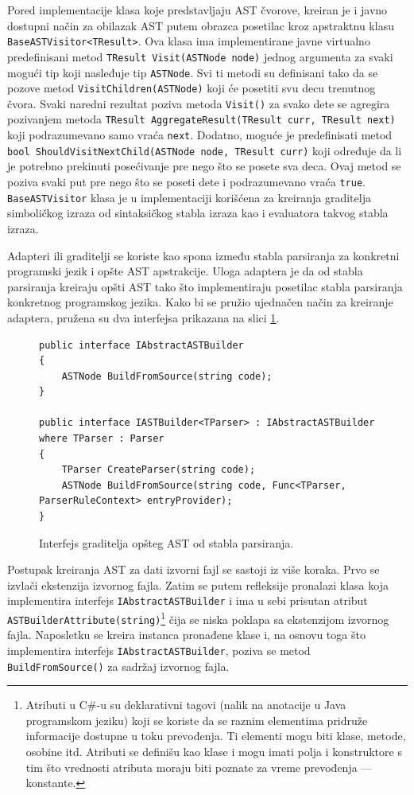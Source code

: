 Pored implementacije klasa koje predstavljaju AST čvorove, kreiran je i javno dostupni način za obilazak AST putem obrazca posetilac kroz apstraktnu klasu \texttt{BaseASTVisitor<TResult>}. Ova klasa ima implementirane javne virtualno predefinisani metod \texttt{TResult Visit(ASTNode node)} jednog argumenta za svaki mogući tip koji nasleđuje tip \texttt{ASTNode}. Svi ti metodi su definisani tako da se pozove metod \texttt{VisitChildren(ASTNode)} koji će posetiti svu decu trenutnog čvora. Svaki naredni rezultat poziva metoda \texttt{Visit()} za svako dete se agregira pozivanjem metoda \texttt{TResult AggregateResult(TResult curr, TResult next)} koji podrazumevano samo vraća \texttt{next}. Dodatno, moguće je predefinisati metod \texttt{bool ShouldVisitNextChild(ASTNode node, TResult curr)} koji određuje da li je potrebno prekinuti posećivanje pre nego što se posete sva deca. Ovaj metod se poziva svaki put pre nego što se poseti dete i podrazumevano vraća \texttt{true}. \texttt{BaseASTVisitor} klasa je u implementaciji korišćena za kreiranja graditelja simboličkog izraza od sintaksičkog stabla izraza kao i evaluatora takvog stabla izraza. 

Adapteri ili graditelji se koriste kao spona između stabla parsiranja za konkretni programski jezik i opšte AST apstrakcije. Uloga adaptera je da od stabla parsiranja kreiraju opšti AST tako \v{s}to implementiraju posetilac stabla parsiranja konkretnog programskog jezika. Kako bi se pružio ujednačen način za kreiranje adaptera, pružena su dva interfejsa prikazana na slici \ref{fig:ImplBuilderInterface}.

\begin{figure}[h!]
\centering
\begin{lstlisting}
public interface IAbstractASTBuilder
{
    ASTNode BuildFromSource(string code);
}

public interface IASTBuilder<TParser> : IAbstractASTBuilder where TParser : Parser
{
    TParser CreateParser(string code);
    ASTNode BuildFromSource(string code, Func<TParser, ParserRuleContext> entryProvider);
}
\end{lstlisting}
\caption{Interfejs graditelja opšteg AST od stabla parsiranja.}
\label{fig:ImplBuilderInterface}
\end{figure}

Postupak kreiranja AST za dati izvorni fajl se sastoji iz više koraka. Prvo se izvlači ekstenzija izvornog fajla. Zatim se putem refleksije pronalazi klasa koja implementira interfejs \texttt{IAbstractASTBuilder} i ima u sebi prisutan atribut \texttt{ASTBuilderAttribute(string)}\footnote{Atributi u C\#-u su deklarativni tagovi (nalik na anotacije u Java programskom jeziku) koji se koriste da se raznim elementima pridruže informacije dostupne u toku prevođenja. Ti elementi mogu biti klase, metode, osobine itd. Atributi se definišu kao klase i mogu imati polja i konstruktore s tim što vrednosti atributa moraju biti poznate za vreme prevođenja --- konstante.}
čija se niska poklapa sa ekstenzijom izvornog fajla. Naposletku se kreira instanca pronađene klase i, na osnovu toga što implementira interfejs \texttt{IAbstractASTBuilder}, poziva se metod \texttt{BuildFromSource()} za sadržaj izvornog fajla.

